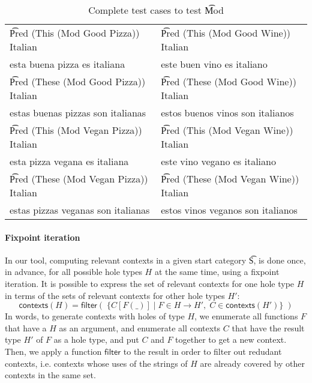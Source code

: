 \begin{table}
\centering
\begin{tabular}{| l | l |}
\hline
\t{Pred (This (Mod Good Pizza)) Italian} & \t{Pred (This (Mod Good Wine))
                                        Italian} \\ 
esta buena pizza es italiana          & este buen vino es italiano \\ \hline
\t{Pred (These (Mod Good Pizza)) Italian} & \t{Pred (These (Mod Good Wine))
                                        Italian} \\ 
estas buenas pizzas son italianas          & estos buenos vinos son italianos \\ \hline
\t{Pred (This (Mod Vegan Pizza)) Italian} & \t{Pred (This (Mod Vegan Wine))
                                        Italian} \\ 
esta pizza vegana es italiana          & este vino vegano es italiano \\ \hline
\t{Pred (These (Mod Vegan Pizza)) Italian} & \t{Pred (These (Mod Vegan Wine))
                                        Italian} \\ 
estas pizzas veganas son italianas          & estos vinos veganos son italianos \\ \hline
\end{tabular}
\caption{Complete test cases to test \t{Mod}}
\label{tab:testCases}
\end{table}

\paragraph{Fixpoint iteration} In our tool, computing relevant contexts in a given start category \t{S}, is done once, in advance, for all possible hole types $H$ at the same time, using a fixpoint iteration. It is possible to express the set of relevant contexts for one hole type $H$ in terms of the sets of relevant contexts for other hole types $H'$:
$$
\textsf{contexts}(H) = \textsf{filter}(\;\{ C[F(\_)] \; | \; F \in H \rightarrow H', \; C \in \textsf{contexts}(H') \}\;)
$$
In words, to generate contexts with holes of type $H$, we enumerate all functions $F$ that have a $H$ as an argument, and enumerate all contexts $C$ that have the result type $H'$ of $F$ as a hole type, and put $C$ and $F$ together to get a new context. Then, we apply a function $\textsf{filter}$ to the result in order to filter out redudant contexts, i.e. contexts whose uses of the strings of $H$ are already covered by other contexts in the same set.

